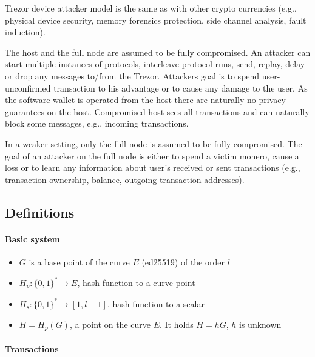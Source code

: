 \documentclass[]{article}
\begin{document}
Trezor device attacker model is the same as with other crypto currencies (e.g., physical device security, memory forensics protection, side channel analysis, fault induction).

The host and the full node are assumed to be fully compromised. An attacker can start multiple instances of protocols, interleave protocol runs, send, replay, delay or drop any messages to/from the Trezor. Attackers goal is to spend user-unconfirmed transaction to his advantage or to cause any damage to the user. As the software wallet is operated from the host there are naturally no privacy guarantees on the host. Compromised host sees all transactions and can naturally block some messages, e.g., incoming transactions. 

In a weaker setting, only the full node is assumed to be fully compromised. The goal of an attacker on the full node is either to spend a victim monero, cause a loss or to learn any information about user's received or sent transactions (e.g., transaction ownership, balance, outgoing transaction addresses).
 
\subsection{Definitions}

\paragraph{Basic system}

\begin{itemize}
	\item $G$ is a base point of the curve $E$ (ed25519) of the order $l$
	\item $H_p : \{0,1\}^* \rightarrow E$, hash function to a curve point
	\item $H_s : \{0,1\}^* \rightarrow [1, l-1]$, hash function to a scalar
	\item $H = H_p(G)$, a point on the curve $E$. It holds $H=hG$, $h$ is unknown
	
\end{itemize}

\paragraph{Transactions}
\end{document}
